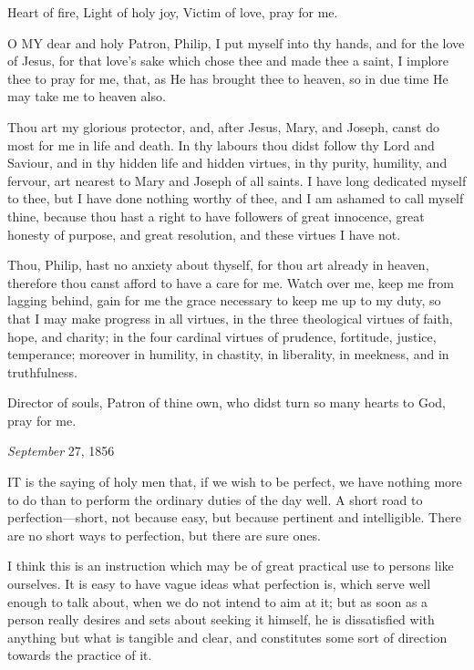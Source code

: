 Heart of fire, Light of holy joy, Victim of love,
pray for me.


O MY dear and
holy Patron, Philip, I put myself into thy hands, and for the love of
Jesus, for that love’s sake which chose thee and made thee a saint, I
implore thee to pray for me, that, as He has brought thee to heaven, so
in due time He may take me to heaven also.

Thou art my glorious protector, and, after Jesus,
Mary, and Joseph, canst do most for me in life and death. In thy labours
thou didst follow thy Lord and Saviour, and in thy hidden life and
hidden virtues, in thy purity, humility, and fervour, art nearest to
Mary and Joseph of all saints. I have long dedicated myself to thee, but
I have done nothing worthy of thee, and I am ashamed to call myself
thine, because thou hast a right to have followers of great innocence,
great honesty of purpose, and great resolution, and these virtues I have
not.

Thou, Philip, hast no anxiety about thyself, for
thou art already in heaven, therefore thou canst afford to have a care
for me. Watch over me, keep me from lagging behind, gain for me the
grace necessary to keep me up to my duty, so that I may make progress in
all virtues, in the three theological virtues of faith, hope, and
charity; in the four cardinal virtues of prudence, fortitude,
justice, temperance; moreover in humility, in chastity, in liberality,
in meekness, and in truthfulness.

Director of souls, Patron of thine own, who didst
turn so many hearts to God, pray for me.


\emph{September} 27, 1856

IT is
the saying of holy men that, if we wish to be perfect, we have nothing
more to do than to perform the ordinary duties of the day well. A short
road to perfection—short, not because easy, but because pertinent and
intelligible. There are no short ways to perfection, but there are sure
ones.

I think this is an instruction which may be of
great practical use to persons like ourselves. It is easy to have vague
ideas what perfection is, which serve well enough to talk about, when we
do not intend to aim at it; but as soon as a person really desires and
sets about seeking it himself, he is dissatisfied with anything but what
is tangible and clear, and constitutes some sort of direction towards
the practice of it.

